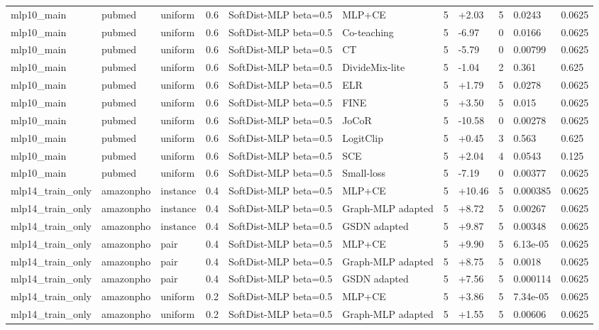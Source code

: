 \begin{table}[t]
\begin{tabular}{llllllrlrll}
mlp10_main & pubmed & uniform & 0.6 & SoftDist-MLP beta=0.5 & MLP+CE & 5 & +2.03 & 5 & 0.0243 & 0.0625 \\
mlp10_main & pubmed & uniform & 0.6 & SoftDist-MLP beta=0.5 & Co-teaching & 5 & -6.97 & 0 & 0.0166 & 0.0625 \\
mlp10_main & pubmed & uniform & 0.6 & SoftDist-MLP beta=0.5 & CT & 5 & -5.79 & 0 & 0.00799 & 0.0625 \\
mlp10_main & pubmed & uniform & 0.6 & SoftDist-MLP beta=0.5 & DivideMix-lite & 5 & -1.04 & 2 & 0.361 & 0.625 \\
mlp10_main & pubmed & uniform & 0.6 & SoftDist-MLP beta=0.5 & ELR & 5 & +1.79 & 5 & 0.0278 & 0.0625 \\
mlp10_main & pubmed & uniform & 0.6 & SoftDist-MLP beta=0.5 & FINE & 5 & +3.50 & 5 & 0.015 & 0.0625 \\
mlp10_main & pubmed & uniform & 0.6 & SoftDist-MLP beta=0.5 & JoCoR & 5 & -10.58 & 0 & 0.00278 & 0.0625 \\
mlp10_main & pubmed & uniform & 0.6 & SoftDist-MLP beta=0.5 & LogitClip & 5 & +0.45 & 3 & 0.563 & 0.625 \\
mlp10_main & pubmed & uniform & 0.6 & SoftDist-MLP beta=0.5 & SCE & 5 & +2.04 & 4 & 0.0543 & 0.125 \\
mlp10_main & pubmed & uniform & 0.6 & SoftDist-MLP beta=0.5 & Small-loss & 5 & -7.19 & 0 & 0.00377 & 0.0625 \\
mlp14_train_only & amazonpho & instance & 0.4 & SoftDist-MLP beta=0.5 & MLP+CE & 5 & +10.46 & 5 & 0.000385 & 0.0625 \\
mlp14_train_only & amazonpho & instance & 0.4 & SoftDist-MLP beta=0.5 & Graph-MLP adapted & 5 & +8.72 & 5 & 0.00267 & 0.0625 \\
mlp14_train_only & amazonpho & instance & 0.4 & SoftDist-MLP beta=0.5 & GSDN adapted & 5 & +9.87 & 5 & 0.00348 & 0.0625 \\
mlp14_train_only & amazonpho & pair & 0.4 & SoftDist-MLP beta=0.5 & MLP+CE & 5 & +9.90 & 5 & 6.13e-05 & 0.0625 \\
mlp14_train_only & amazonpho & pair & 0.4 & SoftDist-MLP beta=0.5 & Graph-MLP adapted & 5 & +8.75 & 5 & 0.0018 & 0.0625 \\
mlp14_train_only & amazonpho & pair & 0.4 & SoftDist-MLP beta=0.5 & GSDN adapted & 5 & +7.56 & 5 & 0.000114 & 0.0625 \\
mlp14_train_only & amazonpho & uniform & 0.2 & SoftDist-MLP beta=0.5 & MLP+CE & 5 & +3.86 & 5 & 7.34e-05 & 0.0625 \\
mlp14_train_only & amazonpho & uniform & 0.2 & SoftDist-MLP beta=0.5 & Graph-MLP adapted & 5 & +1.55 & 5 & 0.00606 & 0.0625 \\

\end{tabular}
\end{table}
